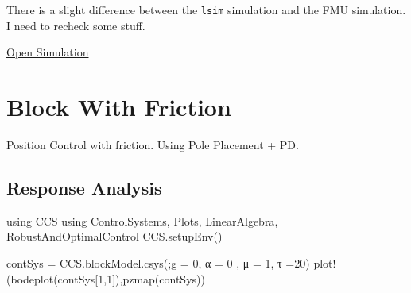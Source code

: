 \documentclass[
  8pt,
  a4paper,
]{book}
\newenvironment{Shaded}{\begin{snugshade}}{\end{snugshade}}
\newcommand{\BuiltInTok}[1]{\textcolor[rgb]{0.00,0.23,0.31}{#1}}
\newcommand{\FloatTok}[1]{\textcolor[rgb]{0.68,0.00,0.00}{#1}}
\newcommand{\FunctionTok}[1]{\textcolor[rgb]{0.28,0.35,0.67}{#1}}
\newcommand{\ImportTok}[1]{\textcolor[rgb]{0.00,0.46,0.62}{#1}}
\newcommand{\NormalTok}[1]{\textcolor[rgb]{0.00,0.23,0.31}{#1}}
\newcommand{\OperatorTok}[1]{\textcolor[rgb]{0.37,0.37,0.37}{#1}}
\begin{document}
There is a slight difference between the \texttt{lsim} simulation and
the FMU simulation. I need to recheck some stuff.

\href{https://pages.icpmol.es/ControlChallenges/index.html?target=TutorialBlockWithFriction&code=bGV0IEtwID0gMzM3OwpsZXQgS2QgPSA2NDsKZnVuY3Rpb24gY29udHJvbEZ1bmN0aW9uKGJsb2NrKQp7CiAgcmV0dXJuIC0oIGJsb2NrLnggKiBLcCArIGJsb2NrLmR4KktkKTsKfQ==}{Open Simulation}

\chapter{Block With Friction}\label{block-with-friction-1}

Position Control with friction. Using Pole Placement + PD.

\hfill\break

\section{Response Analysis}\label{response-analysis}

\begin{Shaded}
\begin{Highlighting}[]
\ImportTok{using} \BuiltInTok{CCS}
\ImportTok{using} \BuiltInTok{ControlSystems}\NormalTok{, }\BuiltInTok{Plots}\NormalTok{, }\BuiltInTok{LinearAlgebra}\NormalTok{, }\BuiltInTok{RobustAndOptimalControl}
\NormalTok{CCS.}\FunctionTok{setupEnv}\NormalTok{()}

\NormalTok{contSys }\OperatorTok{=}\NormalTok{ CCS.blockModel.}\FunctionTok{csys}\NormalTok{(;g }\OperatorTok{=} \FloatTok{0}\NormalTok{, α }\OperatorTok{=} \FloatTok{0}\NormalTok{ , μ }\OperatorTok{=} \FloatTok{1}\NormalTok{, τ }\OperatorTok{=}\FloatTok{20}\NormalTok{)}
\FunctionTok{plot!}\NormalTok{(}\FunctionTok{bodeplot}\NormalTok{(contSys[}\FloatTok{1}\NormalTok{,}\FloatTok{1}\NormalTok{]),}\FunctionTok{pzmap}\NormalTok{(contSys))}
\end{Highlighting}
\end{Shaded}
\end{document}
